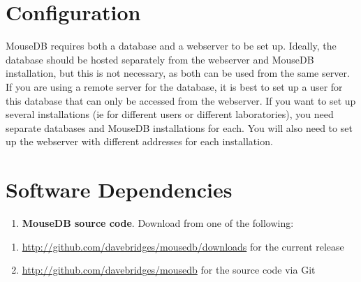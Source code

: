 \documentclass[letterpaper,10pt,english]{sphinxmanual}
\begin{document}
\section{Configuration}

MouseDB requires both a database and a webserver to be set up.  Ideally, the database should be hosted separately from the webserver and MouseDB installation, but this is not necessary, as both can be used from the same server.  If you are using a remote server for the database, it is best to set up a user for this database that can only be accessed from the webserver.  If you want to set up several installations (ie for different users or different laboratories), you need separate databases and MouseDB installations for each.  You will also need to set up the webserver with different addresses for each installation.


\section{Software Dependencies}
\begin{enumerate}
\item {} 
\textbf{MouseDB source code}.  Download from one of the following:

\end{enumerate}
\begin{enumerate}
\item {} 
\href{http://github.com/davebridges/mousedb/downloads}{http://github.com/davebridges/mousedb/downloads} for the current release

\item {} 
\href{http://github.com/davebridges/mousedb}{http://github.com/davebridges/mousedb} for the source code via Git

\end{enumerate}
\end{document}
